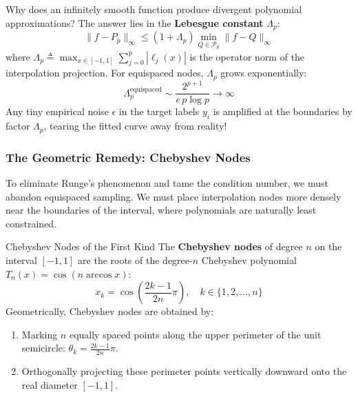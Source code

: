 Why does an infinitely smooth function produce divergent polynomial approximations? The answer lies in the \textbf{Lebesgue constant} $\Lambda_p$:
\begin{equation}
\|f - P_p\|_\infty \le (1 + \Lambda_p) \min_{Q \in \mathcal{P}_p} \|f - Q\|_\infty
\end{equation}
where $\Lambda_p \triangleq \max_{x \in [-1, 1]} \sum_{j=0}^p |\ell_j(x)|$ is the operator norm of the interpolation projection. For equispaced nodes, $\Lambda_p$ grows exponentially:
\begin{equation}
\Lambda_p^{\text{equispaced}} \sim \frac{2^{p+1}}{e\, p \log p} \to \infty
\end{equation}
Any tiny empirical noise $\epsilon$ in the target labels $y_i$ is amplified at the boundaries by factor $\Lambda_p$, tearing the fitted curve away from reality!

\subsubsection{The Geometric Remedy: Chebyshev Nodes}
To eliminate Runge's phenomenon and tame the condition number, we must abandon equispaced sampling. We must place interpolation nodes more densely near the boundaries of the interval, where polynomials are naturally least constrained.

\begin{definitionbox}{Chebyshev Nodes of the First Kind}
\label{def:chebyshev_nodes}
The \textbf{Chebyshev nodes} of degree $n$ on the interval $[-1, 1]$ are the roots of the degree-$n$ Chebyshev polynomial $T_n(x) = \cos(n \arccos x)$:
\begin{equation}
x_k = \cos\left( \frac{2k - 1}{2n}\pi \right), \quad k \in \{1, 2, \dots, n\}
\label{eq:chebyshev_nodes}
\end{equation}
Geometrically, Chebyshev nodes are obtained by:
\begin{enumerate}
    \item Marking $n$ equally spaced points along the upper perimeter of the unit semicircle: $\theta_k = \frac{2k-1}{2n}\pi$.
    \item Orthogonally projecting these perimeter points vertically downward onto the real diameter $[-1, 1]$.
\end{enumerate}
\end{definitionbox}

